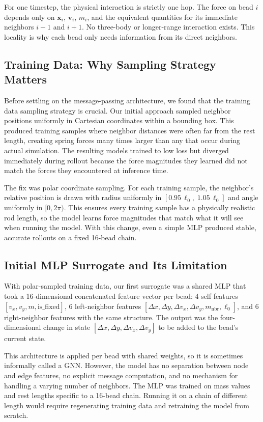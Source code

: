 \documentclass[conference]{IEEEtran}
\begin{document}
For one timestep, the physical interaction is strictly one hop. The force on bead $i$ depends only on $\mathbf{x}_i$, $\mathbf{v}_i$, $m_i$, and the equivalent quantities for its immediate neighbors $i-1$ and $i+1$. No three-body or longer-range interaction exists. This locality is why each bead only needs information from its direct neighbors.

\subsection{Training Data: Why Sampling Strategy Matters}

Before settling on the message-passing architecture, we found that the training data sampling strategy is crucial. Our initial approach sampled neighbor positions uniformly in Cartesian coordinates within a bounding box. This produced training samples where neighbor distances were often far from the rest length, creating spring forces many times larger than any that occur during actual simulation. The resulting models trained to low loss but diverged immediately during rollout because the force magnitudes they learned did not match the forces they encountered at inference time.

The fix was polar coordinate sampling. For each training sample, the neighbor's relative position is drawn with radius uniformly in $[0.95\,\ell_0,\; 1.05\,\ell_0]$ and angle uniformly in $[0, 2\pi)$. This ensures every training sample has a physically realistic rod length, so the model learns force magnitudes that match what it will see when running the model. With this change, even a simple MLP produced stable, accurate rollouts on a fixed 16-bead chain.

\subsection{Initial MLP Surrogate and Its Limitation}

With polar-sampled training data, our first surrogate was a shared MLP that took a 16-dimensional concatenated feature vector per bead: 4 self features $[v_x, v_y, m, \text{is\_fixed}]$, 6 left-neighbor features $[\Delta x, \Delta y, \Delta v_x, \Delta v_y, m_{\text{nbr}}, \ell_0]$, and 6 right-neighbor features with the same structure. The output was the four-dimensional change in state $[\Delta x, \Delta y, \Delta v_x, \Delta v_y]$ to be added to the bead's current state.

This architecture is applied per bead with shared weights, so it is sometimes informally called a GNN. However, the model has no separation between node and edge features, no explicit message computation, and no mechanism for handling a varying number of neighbors. The MLP was trained on mass values and rest lengths specific to a 16-bead chain. Running it on a chain of different length would require regenerating training data and retraining the model from scratch.
\end{document}
